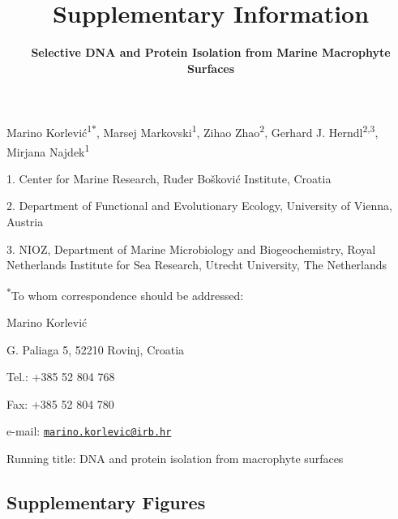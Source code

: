 \documentclass[12pt,]{article}
\title{\textbf{Supplementary Information}}
\subtitle{\textbf{Selective DNA and Protein Isolation from Marine Macrophyte
Surfaces}}
\author{}
\date{}
\begin{document}
\maketitle

\vspace{20mm}

Marino Korlević\textsuperscript{1\(*\)}, Marsej
Markovski\textsuperscript{1}, Zihao Zhao\textsuperscript{2}, Gerhard J.
Herndl\textsuperscript{2,3}, Mirjana Najdek\textsuperscript{1}

1. Center for Marine Research, Ruđer Bošković Institute, Croatia

2. Department of Functional and Evolutionary Ecology, University of
Vienna, Austria

3. NIOZ, Department of Marine Microbiology and Biogeochemistry, Royal
Netherlands Institute for Sea Research, Utrecht University, The
Netherlands

\textsuperscript{\(*\)}To whom correspondence should be addressed:

Marino Korlević

G. Paliaga 5, 52210 Rovinj, Croatia

Tel.: +385 52 804 768

Fax: +385 52 804 780

e-mail:
\href{mailto:marino.korlevic@irb.hr}{\nolinkurl{marino.korlevic@irb.hr}}

Running title: DNA and protein isolation from macrophyte surfaces

\linenumbers
{}
\setlength\parindent{24pt}

\hypertarget{supplementary-figures}{%
\subsection{Supplementary Figures}\label{supplementary-figures}}
\end{document}
